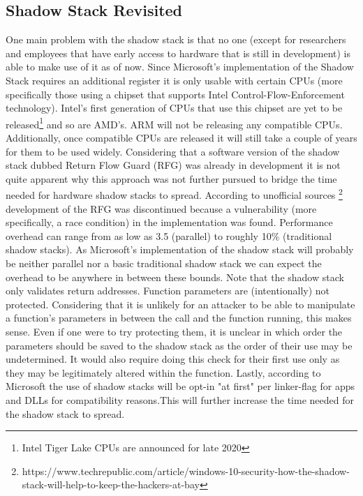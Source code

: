 \documentclass[10pt,twocolumn,a4paper]{article}
\begin{document}
\subsection{Shadow Stack Revisited}
One main problem with the shadow stack is that no one (except for researchers and employees that have early access to hardware that is still in development) is able to make use of it as of now. Since Microsoft's implementation of the Shadow Stack requires an additional register it is only usable with certain CPUs (more specifically those using a chipset that supports Intel Control-Flow-Enforcement technology)\cite{CFE}.
Intel's first generation of CPUs that use this chipset are yet to be released\footnote{Intel Tiger Lake CPUs are announced for late 2020} and so are AMD's.
\newline ARM will not be releasing any compatible CPUs\cite{techrepublic}.
Additionally, once compatible CPUs are released it will still take a couple of years for them to be used widely.
Considering that a software version of the shadow stack dubbed Return Flow Guard (RFG)\cite{RFG} was already in development it is not quite apparent why this approach was not further pursued to bridge the time needed for hardware shadow stacks to spread.
According to unofficial sources \footnote{https://www.techrepublic.com/article/windows-10-security-how-the-shadow-stack-will-help-to-keep-the-hackers-at-bay} development of the RFG was discontinued because a vulnerability (more specifically, a race condition) in the implementation was found.
Performance overhead can range from as low as 3.5 (parallel) to roughly 10\% (traditional shadow stacks)\cite{performance}. As Microsoft's implementation of the shadow stack will probably be neither parallel nor a basic traditional shadow stack we can expect the overhead to be anywhere in between these bounds.
Note that the shadow stack only validates return addresses. Function parameters are (intentionally) not protected.
Considering that it is unlikely for an attacker to be able to manipulate a function's parameters in between the call and the function running, this makes sense. Even if one were to try protecting them, it is unclear in which order the parameters should be saved to the shadow stack as the order of their use may be undetermined. It would also require doing this check for their first use only as they may be legitimately altered within the function.
Lastly, according to Microsoft the use of shadow stacks will be opt-in "at first" per linker-flag for apps and DLLs for compatibility reasons.This will further increase the time needed for the shadow stack to spread.
\end{document}
